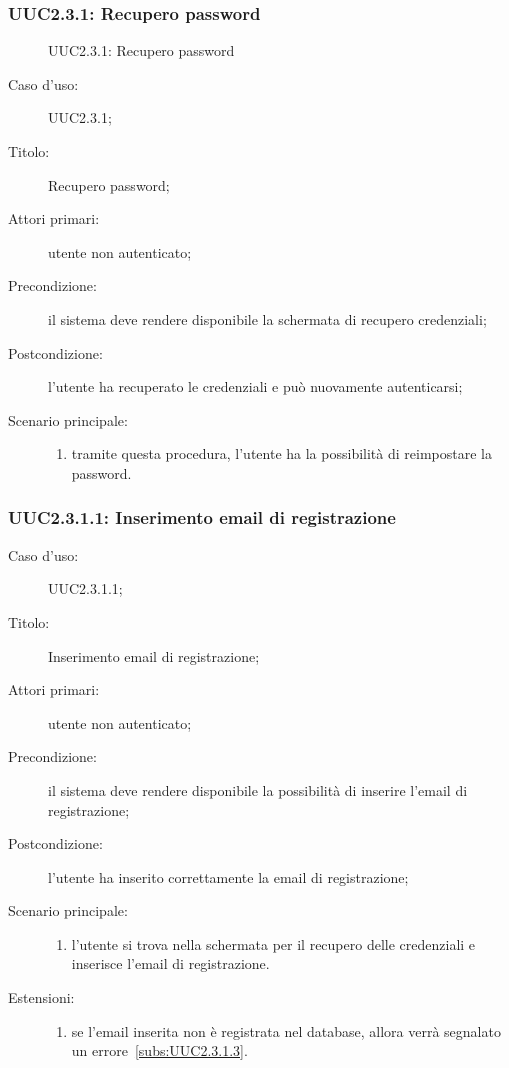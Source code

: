 \documentclass[../../../analisi-dei-requisiti.tex]{subfiles}
\begin{document}
\subsubsection{UUC2.3.1: Recupero password}%
\label{subs:UUC2.3.1}

\begin{figure}[H]
  \centering
  \caption{UUC2.3.1: Recupero password}%
  \label{fig:uuc2_3_1}
\end{figure}

\begin{description}
  \item[Caso d’uso:] UUC2.3.1;
  \item[Titolo:] Recupero password;
  \item[Attori primari:] utente non autenticato;
  \item[Precondizione:] il sistema deve rendere disponibile la schermata di recupero credenziali;
  \item[Postcondizione:] l'utente ha recuperato le credenziali e può nuovamente autenticarsi;
  \item[Scenario principale:]
        \begin{enumerate}
          \item tramite questa procedura, l’utente ha la possibilità di reimpostare la password.
        \end{enumerate}
\end{description}

\subsubsection{UUC2.3.1.1: Inserimento email di registrazione}%
\label{subs:UUC2.3.1.1}
\begin{description}
  \item[Caso d’uso:] UUC2.3.1.1;
  \item[Titolo:] Inserimento email di registrazione;
  \item[Attori primari:] utente non autenticato;
  \item[Precondizione:] il sistema deve rendere disponibile la possibilità di inserire l'email di registrazione;
  \item[Postcondizione:] l'utente ha inserito correttamente la email di registrazione;
  \item[Scenario principale:]
        \begin{enumerate}
          \item l'utente si trova nella schermata per il recupero delle credenziali e inserisce l'email di registrazione.
        \end{enumerate}
  \item[Estensioni:]
        \begin{enumerate}
          \item se l'email inserita non è registrata nel database, allora verrà segnalato un errore~\ref{subs:UUC2.3.1.3}.
        \end{enumerate}
\end{description}
\end{document}
